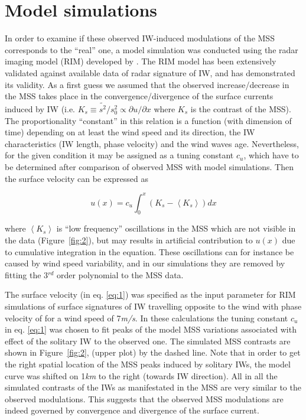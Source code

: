 \documentclass{report}
\begin{document}
\section{Model simulations}

In order to examine if these observed IW-induced modulations of the MSS corresponds to the ``real'' one,  a model simulation was conducted using the radar imaging model (RIM) developed by \cite{Kudryavtsev2005}. The RIM model has been extensively validated against available data of radar signature of IW, and has demonstrated its validity.  As a first guess we assumed that the observed increase/decrease in the MSS takes place in the convergence/divergence of the surface currents induced by IW (i.e. $K_s \equiv \tilde{s^2} / s_0^2 \propto \partial u / \partial x$ where $K_s$ is the contrast of the MSS). The proportionality ``constant'' in this relation is a function (with dimension of time) depending on at least the wind speed and its direction, the IW characteristics (IW length, phase velocity) and the wind waves age. Nevertheless, for the given condition it may be assigned as a tuning constant $c_u$, which have to be determined after comparison of observed MSS with model simulations.  Then the surface velocity can be expressed as

\begin{equation}
u(x) = c_u \int_0^x \left( K_s - \left\langle K_s \right\rangle \right) dx
\label{eq:1}
\end{equation}

\noindent where $\left\langle K_s \right\rangle$ is ``low frequency'' oscillations in the MSS which are not visible in the data (Figure~\ref{fig:2}), but may results in artificial contribution to $u(x)$ due to cumulative integration in the equation.  These oscillations can for instance be caused by wind speed variability, and in our simulations they are removed by fitting the 3${}^{rd}$ order polynomial to the MSS data.  

The surface velocity (in eq. \eqref{eq:1}) was specified as the input parameter for RIM simulations of surface signatures of IW travelling opposite to the wind with phase velocity of  for a wind speed of 7\textit{m/s}. In these calculations the tuning constant $c_u$ in eq. \eqref{eq:1} was chosen to fit peaks of the model MSS variations associated with effect of the solitary IW to the observed one. The simulated MSS contrasts are shown in Figure~\ref{fig:2}, (upper plot) by the dashed line. Note that in order to get the right spatial location of the MSS peaks induced by solitary IWs, the model curve was shifted on 1\textit{km} to the right (towards IW direction). All in all the simulated contrasts of the IWs as manifestated in the MSS are very similar to the observed modulations. This suggests that the observed MSS modulations are indeed governed by convergence and divergence of the surface current.
\end{document}
